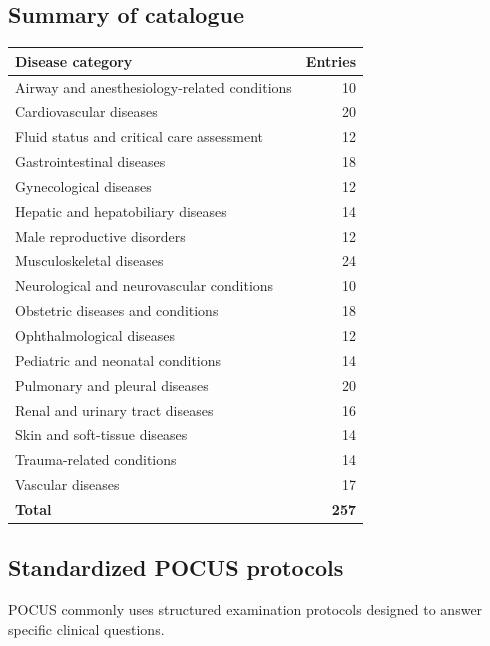 \subsection{Summary of catalogue}
\begin{tabular}{@{}p{}r@{}}
\toprule
\textbf{Disease category} & \textbf{Entries} \\
\midrule
Airway and anesthesiology-related conditions & 10 \\
Cardiovascular diseases & 20 \\
Fluid status and critical care assessment & 12 \\
Gastrointestinal diseases & 18 \\
Gynecological diseases & 12 \\
Hepatic and hepatobiliary diseases & 14 \\
Male reproductive disorders & 12 \\
Musculoskeletal diseases & 24 \\
Neurological and neurovascular conditions & 10 \\
Obstetric diseases and conditions & 18 \\
Ophthalmological diseases & 12 \\
Pediatric and neonatal conditions & 14 \\
Pulmonary and pleural diseases & 20 \\
Renal and urinary tract diseases & 16 \\
Skin and soft-tissue diseases & 14 \\
Trauma-related conditions & 14 \\
Vascular diseases & 17 \\
\midrule
\textbf{Total} & \textbf{257} \\
\bottomrule
\end{tabular}

\subsection{Standardized POCUS protocols}
POCUS commonly uses structured examination protocols designed to answer specific clinical questions.

